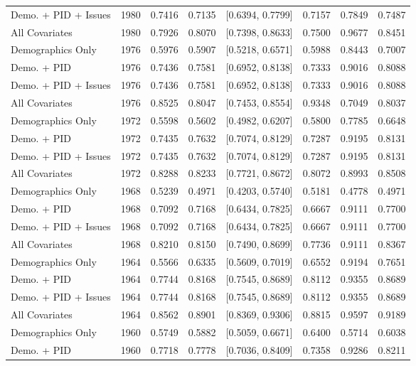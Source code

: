 \begin{longtable}{lrrrlrrr}
  Demo. + PID + Issues & 1980 & 0.7416 & 0.7135 & [0.6394, 0.7799] & 0.7157 & 0.7849 & 0.7487 \\ 
  All Covariates & 1980 & 0.7926 & 0.8070 & [0.7398, 0.8633] & 0.7500 & 0.9677 & 0.8451 \\ 
  Demographics Only & 1976 & 0.5976 & 0.5907 & [0.5218, 0.6571] & 0.5988 & 0.8443 & 0.7007 \\ 
  Demo. + PID & 1976 & 0.7436 & 0.7581 & [0.6952, 0.8138] & 0.7333 & 0.9016 & 0.8088 \\ 
  Demo. + PID + Issues & 1976 & 0.7436 & 0.7581 & [0.6952, 0.8138] & 0.7333 & 0.9016 & 0.8088 \\ 
  All Covariates & 1976 & 0.8525 & 0.8047 & [0.7453, 0.8554] & 0.9348 & 0.7049 & 0.8037 \\ 
  Demographics Only & 1972 & 0.5598 & 0.5602 & [0.4982, 0.6207] & 0.5800 & 0.7785 & 0.6648 \\ 
  Demo. + PID & 1972 & 0.7435 & 0.7632 & [0.7074, 0.8129] & 0.7287 & 0.9195 & 0.8131 \\ 
  Demo. + PID + Issues & 1972 & 0.7435 & 0.7632 & [0.7074, 0.8129] & 0.7287 & 0.9195 & 0.8131 \\ 
  All Covariates & 1972 & 0.8288 & 0.8233 & [0.7721, 0.8672] & 0.8072 & 0.8993 & 0.8508 \\ 
  Demographics Only & 1968 & 0.5239 & 0.4971 & [0.4203, 0.5740] & 0.5181 & 0.4778 & 0.4971 \\ 
  Demo. + PID & 1968 & 0.7092 & 0.7168 & [0.6434, 0.7825] & 0.6667 & 0.9111 & 0.7700 \\ 
  Demo. + PID + Issues & 1968 & 0.7092 & 0.7168 & [0.6434, 0.7825] & 0.6667 & 0.9111 & 0.7700 \\ 
  All Covariates & 1968 & 0.8210 & 0.8150 & [0.7490, 0.8699] & 0.7736 & 0.9111 & 0.8367 \\ 
  Demographics Only & 1964 & 0.5566 & 0.6335 & [0.5609, 0.7019] & 0.6552 & 0.9194 & 0.7651 \\ 
  Demo. + PID & 1964 & 0.7744 & 0.8168 & [0.7545, 0.8689] & 0.8112 & 0.9355 & 0.8689 \\ 
  Demo. + PID + Issues & 1964 & 0.7744 & 0.8168 & [0.7545, 0.8689] & 0.8112 & 0.9355 & 0.8689 \\ 
  All Covariates & 1964 & 0.8562 & 0.8901 & [0.8369, 0.9306] & 0.8815 & 0.9597 & 0.9189 \\ 
  Demographics Only & 1960 & 0.5749 & 0.5882 & [0.5059, 0.6671] & 0.6400 & 0.5714 & 0.6038 \\ 
  Demo. + PID & 1960 & 0.7718 & 0.7778 & [0.7036, 0.8409] & 0.7358 & 0.9286 & 0.8211 \\ 

\end{longtable}
